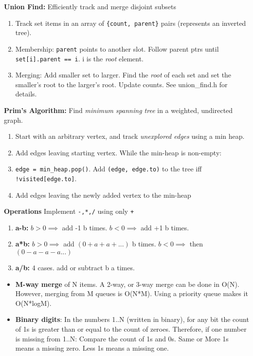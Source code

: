 \documentclass[12pt]{article}
\begin{document}
\vspace{5mm}
\noindent
\textbf{Union Find:}
Efficiently track and merge disjoint subsets
\begin{enumerate}
\item Track set items in an array of \texttt{\{count, parent\}} pairs (represents an inverted tree).
\item Membership: \texttt{parent} points to another slot. Follow parent ptrs until \texttt{set[i].parent == i}. i is the \emph{root} element.
\item Merging: Add smaller set to larger. Find the \emph{root} of each set and set the smaller's root
to the larger's root. Update counts. See union\_find.h for details.
\end{enumerate}


\vspace{5mm}
\noindent
\textbf{Prim's Algorithm:}
Find \emph{minimum spanning tree} in a weighted, undirected graph.
\begin{enumerate}
\item Start with an arbitrary vertex, and track \emph{unexplored edges} using a min heap.
\item Add edges leaving starting vertex. While the min-heap is non-empty:
\item \texttt{edge = min\_heap.pop()}. Add \texttt{(edge, edge.to)} to the tree iff \texttt{!visited[edge.to]}.
\item Add edges leaving the newly added vertex to the min-heap 
\end{enumerate}


\vspace{5mm}
\noindent
\textbf{Operations}
Implement \texttt{-,*,/} using only \texttt{+}
\begin{enumerate}
\item \textbf{a-b:} $b > 0 \implies$ add -1 b times. $b < 0 \implies$ add +1 b times. 
\item \textbf{a*b:} $b > 0 \implies$ add $(0 + a + a + ...)$ b times. $b < 0 \implies$ then $(0 -a -a - a...)$
\item \textbf{a/b:} 4 cases. add or subtract b a times.
\end{enumerate}


\vspace{5mm}
\begin{itemize}
\item \textbf{M-way merge} of N items. A 2-way, or 3-way merge can be done in O(N). However, merging from M queues is O(N*M). Using a priority queue makes it O(N*logM).
\item \textbf{Binary digits}: In the numbers 1..N (written in binary), for any bit the count of 1s is greater than or equal to the count of zeroes. Therefore, if one number is missing from 1..N: Compare the count of 1s and 0s. Same or More 1s means a missing zero. Less 1s means a missing one.
\end{itemize}
\end{document}
